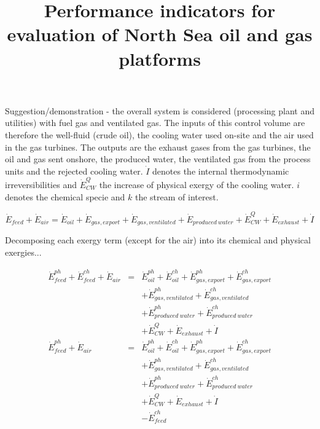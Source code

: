 \documentclass[preprint,times,review,3p]{elsarticle}
\begin{document}
\title{Performance indicators for evaluation of North Sea oil and gas platforms}
			
Suggestion/demonstration - the overall system is considered (processing plant and utilities) with fuel gas and ventilated gas. The inputs of this control volume are therefore the well-fluid (crude oil), the cooling water used on-site and the air used in the gas turbines. The outputs are the exhaust gases from the gas turbines, the oil and gas sent onshore, the produced water, the ventilated gas from the process units and the rejected cooling water. $\dot{I}$ denotes the internal thermodynamic irreversibilities and $\dot{E}^Q_{CW}$ the increase of physical exergy of the cooling water. $i$ denotes the chemical specie and $k$ the stream of interest.

		\begin{equation}
			\dot{E}_{feed}+\dot{E}_{air} = \dot{E}_{oil}+\dot{E}_{gas,export}+\dot{E}_{gas,ventilated}\nonumber+\dot{E}_{produced\ water}+\dot{E}^Q_{CW}+\dot{E}_{exhaust}+\dot{I}
		\end{equation}
		
Decomposing each exergy term (except for the air) into its chemical and physical exergies...

		\begin{eqnarray}
		    \dot{E}_{feed}^{ph}+\dot{E}_{feed}^{ch}+\dot{E}_{air} &=& \dot{E}_{oil}^{ph}+\dot{E}_{oil}^{ch}+\dot{E}_{gas,export}^{ph}+\dot{E}_{gas,export}^{ch}\nonumber\\
																							&&+\dot{E}_{gas,ventilated}^{ph}+\dot{E}_{gas,ventilated}^{ch}\nonumber\\&&+\dot{E}_{produced\ water}^{ph}+\dot{E}_{produced\ water}^{ch}\nonumber\\
																							&&+\dot{E}^Q_{CW}+\dot{E}_{exhaust}+\dot{I} \\
			\dot{E}_{feed}^{ph}+\dot{E}_{air} &=& \dot{E}_{oil}^{ph}+\dot{E}_{oil}^{ch}+\dot{E}_{gas,export}^{ph}+\dot{E}_{gas,export}^{ch}\nonumber\\
																							&&+\dot{E}_{gas,ventilated}^{ph}+\dot{E}_{gas,ventilated}^{ch}\nonumber\\&&+\dot{E}_{produced\ water}^{ph}+\dot{E}_{produced\ water}^{ch}\nonumber\\
																							&&+\dot{E}^Q_{CW}+\dot{E}_{exhaust}+\dot{I}\nonumber\\
																							&&-\dot{E}_{feed}^{ch}
		\end{eqnarray}
		
\end{document}
